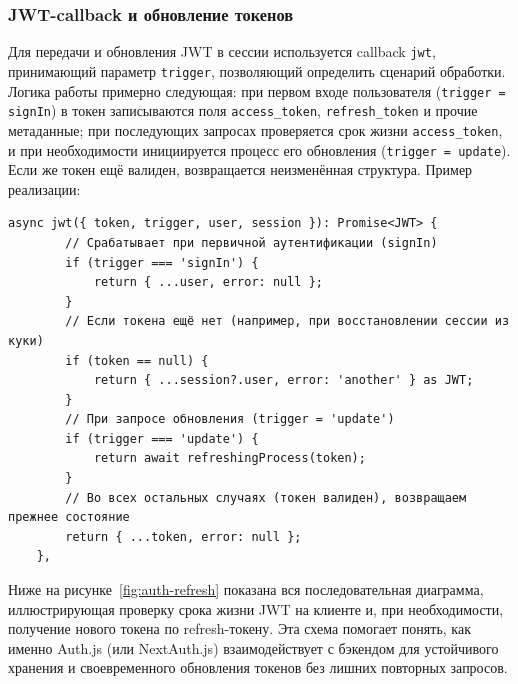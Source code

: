 \subsubsection{JWT-callback и обновление токенов}
Для передачи и обновления JWT в сессии используется callback \texttt{jwt}, принимающий параметр \texttt{trigger}, позволяющий определить сценарий обработки. Логика работы примерно следующая: при первом входе пользователя (\texttt{trigger = signIn}) в токен записываются поля \texttt{access\_token}, \texttt{refresh\_token} и прочие метаданные; при последующих запросах проверяется срок жизни \texttt{access\_token}, и при необходимости инициируется процесс его обновления (\texttt{trigger = update}). Если же токен ещё валиден, возвращается неизменённая структура. Пример реализации:

\begin{lstlisting}[caption={JWT-callback с учётом trigger}]
	async jwt({ token, trigger, user, session }): Promise<JWT> {
		// Срабатывает при первичной аутентификации (signIn)
		if (trigger === 'signIn') {
			return { ...user, error: null };
		}
		// Если токена ещё нет (например, при восстановлении сессии из куки)
		if (token == null) {
			return { ...session?.user, error: 'another' } as JWT;
		}
		// При запросе обновления (trigger = 'update')
		if (trigger === 'update') {
			return await refreshingProcess(token);
		}
		// Во всех остальных случаях (токен валиден), возвращаем прежнее состояние
		return { ...token, error: null };
	},
\end{lstlisting}

Ниже на рисунке~\ref{fig:auth-refresh} показана вся последовательная диаграмма, иллюстрирующая проверку срока жизни JWT на клиенте и, при необходимости, получение нового токена по refresh-токену. Эта схема помогает понять, как именно Auth.js (или NextAuth.js) взаимодействует с бэкендом для устойчивого хранения и своевременного обновления токенов без лишних повторных запросов.

